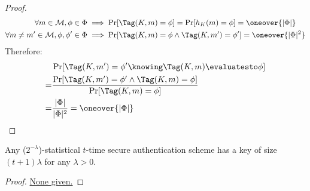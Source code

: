 \begin{proof}
    \begin{align*}
        \forall m \in \M, \phi \in \Phi &\implies \Pr[\Tag(K, m) = \phi] = \Pr[h_K(m) = \phi] = \oneover{|\Phi|} \\
        \forall m \neq m' \in \M, \phi, \phi' \in \Phi &\implies \Pr[\Tag(K, m) = \phi \wedge \Tag(K, m') = \phi'] = \oneover{|\Phi|^2} \\
    \end{align*}
    Therefore:
    \begin{align*}
        & \Pr[\Tag(K, m') = \phi' \knowing \Tag(K, m) \evaluatesto \phi] \\
        =& \frac{\Pr[\Tag(K, m') = \phi' \wedge \Tag(K, m) = \phi]}{\Pr[\Tag(K, m) = \phi]} \\
        =& \frac{|\Phi|}{|\Phi|^2} = \oneover{|\Phi|}
    \end{align*}
\end{proof}

\begin{theorem}
    Any ($2^{-\lambda}$)-statistical $t$-time secure authentication scheme has a key of size $(t + 1) \lambda$ for any $\lambda > 0$.
\end{theorem}

\begin{proof}
    \underline{None given.}

\end{proof}
